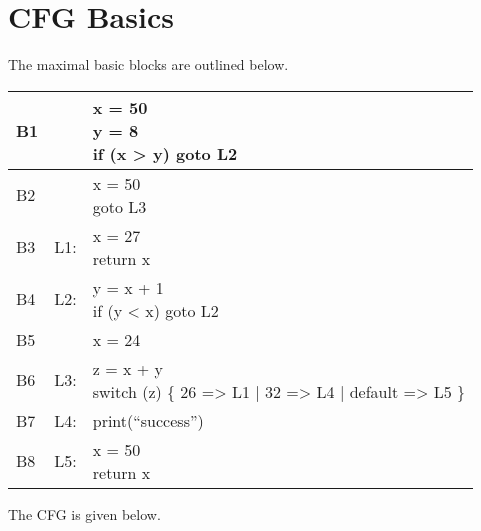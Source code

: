 \section{CFG Basics}

The maximal basic blocks are outlined below. 


\begin{table}[!ht]
\centering
\begin{tabular}{| l | l l |}
\hline
B1 & & \shortstack[l]{x = 50 \\ y = 8 \\ if (x > y) goto L2} \\
\hline
B2 & & \shortstack[l]{x = 50 \\ goto L3} \\
\hline
B3 & L1: & \shortstack[l]{x = 27 \\ return x}\\
\hline
B4 & L2: & \shortstack[l]{y = x + 1 \\ if (y < x) goto L2}\\
\hline
B5 &  & x = 24\\
\hline
B6 & L3: & \shortstack[l]{z = x + y \\ switch (z) \{ 26 => L1 | 32 => L4 | default => L5 \} } \\
\hline
B7 & L4: & print(``success'') \\
\hline
B8 & L5: & \shortstack[l]{x = 50\\return x}\\
\hline
\end{tabular}
\end{table}

The CFG is given below.

